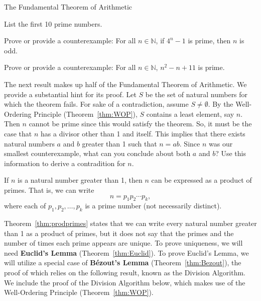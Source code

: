 \begin{section}{The Fundamental Theorem of Arithmetic}
\begin{problem}
List the first 10 prime numbers.
\end{problem}

\begin{problem}
Prove or provide a counterexample:  For all $n\in\mathbb{N}$, if $4^n-1$ is prime, then $n$ is odd.
\end{problem}

\begin{problem}
Prove or provide a counterexample:  For all $n\in\mathbb{N}$, $n^2-n+11$ is prime.
\end{problem}

The next result makes up half of the Fundamental Theorem of Arithmetic. We provide a substantial hint for its proof. Let $S$ be the set of natural numbers for which the theorem fails.  For sake of a contradiction, assume $S\neq \emptyset$.  By the Well-Ordering Principle (Theorem~\ref{thm:WOP}), $S$ contains a least element, say $n$. Then $n$ cannot be prime since this would satisfy the theorem.  So, it must be the case that $n$ has a divisor other than 1 and itself.  This implies that there exists natural numbers $a$ and $b$ greater than 1 such that $n=ab$.  Since $n$ was our smallest counterexample, what can you conclude about both $a$ and $b$?  Use this information to derive a contradition for $n$.

\begin{theorem}\label{thm:prodprimes}
If $n$ is a natural number greater than 1, then $n$ can be expressed as a product of primes.  That is, we can write
\[
n=p_1 p_2 \cdots p_k,
\]
where each of $p_1, p_2, \ldots, p_k$ is a prime number (not necessarily distinct).
\end{theorem}

Theorem~\ref{thm:prodprimes} states that we can write every natural number greater than 1 as a product of primes, but it does not say that the primes and the number of times each prime appears are unique.  To prove uniqueness, we will need \textbf{Euclid's Lemma} (Theorem~\ref{thm:Euclid}). To prove Euclid's Lemma, we will utilize a special case of \textbf{B\'ezout's Lemma} (Theorem~\ref{thm:Bezout}), the proof of which relies on the following result, known as the Division Algorithm. We include the proof of the Division Algorithm below, which makes use of the Well-Ordering Principle (Theorem~\ref{thm:WOP}). %


\end{section}

